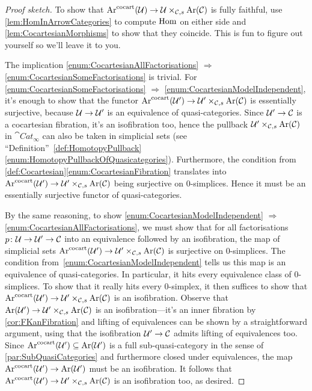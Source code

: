 \begin{proof}[Proof sketch]
	To show that $\operatorname{Ar}^{\mathrm{cocart}}(\mathcal{U})\rightarrow \mathcal{U}\times_{\mathcal{C},s}\operatorname{Ar}(\mathcal{C})$ is fully faithful, use \cref{lem:HomInArrowCategories} to compute $\operatorname{Hom}$ on either side and \cref{lem:CocartesianMorphisms} to show that they coincide. This is fun to figure out yourself so we'll leave it to you.
	
	The implication \cref{enum:CocartesianAllFactorisations} $\Rightarrow$ \cref{enum:CocartesianSomeFactorisations} is trivial. For \cref{enum:CocartesianSomeFactorisations} $\Rightarrow$ \cref{enum:CocartesianModelIndependent}, it's enough to show that the functor $\operatorname{Ar}^{\mathrm{cocart}}(\mathcal{U}')\rightarrow \mathcal{U}'\times_{\mathcal{C},s}\operatorname{Ar}(\mathcal{C})$ is essentially surjective, because $\mathcal{U}\rightarrow \mathcal{U}'$ is an equivalence of quasi-categories. Since $\mathcal{U}'\rightarrow \mathcal{C}$ is a cocartesian fibration, it's an isofibration too, hence the pullback $\mathcal{U}'\times_{\mathcal{C},s}\operatorname{Ar}(\mathcal{C})$ in $\cat{Cat}_\infty$ can also be taken in simplicial sets (see \enquote{Definition}~\cref{def:HomotopyPullback}\cref{enum:HomotopyPullbackOfQuasicategories}). Furthermore, the condition from \cref{def:Cocartesian}\cref{enum:CocartesianFibration} translates into $\operatorname{Ar}^{\mathrm{cocart}}(\mathcal{U}')\rightarrow \mathcal{U}'\times_{\mathcal{C},s}\operatorname{Ar}(\mathcal{C})$ being surjective on $0$-simplices. Hence it must be an essentially surjective functor of quasi-categories.
	
	By the same reasoning, to show \cref{enum:CocartesianModelIndependent} $\Rightarrow$ \cref{enum:CocartesianAllFactorisations}, we must show that for all factorisations $p\colon \mathcal{U}\rightarrow \mathcal{U}'\rightarrow \mathcal{C}$ into an equivalence followed by an isofibration, the map of simplicial sets $\operatorname{Ar}^{\mathrm{cocart}}(\mathcal{U}')\rightarrow \mathcal{U}'\times_{\mathcal{C},s}\operatorname{Ar}(\mathcal{C})$ is surjective on $0$-simplices. The condition from~\cref{enum:CocartesianModelIndependent} tells us this map is an equivalence of quasi-categories. In particular, it hits every equivalence class of $0$-simplices. To show that it really hits every $0$-simplex, it then suffices to show that $\operatorname{Ar}^{\mathrm{cocart}}(\mathcal{U}')\rightarrow \mathcal{U}'\times_{\mathcal{C},s}\operatorname{Ar}(\mathcal{C})$ is an isofibration. Observe that $\operatorname{Ar}(\mathcal{U}')\rightarrow\mathcal{U}'\times_{\mathcal{C},s}\operatorname{Ar}(\mathcal{C})$ is an isofibration---it's an inner fibration by \cref{cor:FKanFibration} and lifting of equivalences can be shown by a straightforward argument, using that the isofibration $\mathcal{U}'\rightarrow \mathcal{C}$ admits lifting of equivalences too. Since $\operatorname{Ar}^{\mathrm{cocart}}(\mathcal{U}')\subseteq \operatorname{Ar}(\mathcal{U}')$ is a full sub-quasi-category in the sense of \cref{par:SubQuasiCategories} and furthermore closed under equivalences, the map $\operatorname{Ar}^{\mathrm{cocart}}(\mathcal{U}')\rightarrow \operatorname{Ar}(\mathcal{U}')$ must be an isofibration. It follows that $\operatorname{Ar}^{\mathrm{cocart}}(\mathcal{U}')\rightarrow \mathcal{U}'\times_{\mathcal{C},s}\operatorname{Ar}(\mathcal{C})$ is an isofibration too, as desired.
\end{proof}



